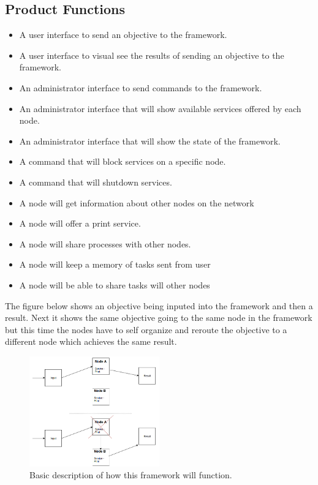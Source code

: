 \documentclass[draftclsnofoot, onecolumn, compsoc, 10pt]{IEEEtran}
\begin{document}
\subsection{Product Functions}
\begin{itemize}
\item A user interface to send an objective to the framework.
\item A user interface to visual see the results of sending an objective to the framework.
\item An administrator interface to send commands to the framework.
\item An administrator interface that will show available services offered by each node. \item An administrator interface that will show the state of the framework.
\item A command that will block services on a specific node.
\item A command that will shutdown services.
\item A node will get information about other nodes on the network
\item A node will offer a print service.
\item A node will share processes with other nodes.
\item A node will keep a memory of tasks sent from user
\item A node will be able to share tasks will other nodes
\end{itemize}
The figure below shows an objective being inputed into the framework and then a result. Next it shows the same objective going to the same node in the framework but this time the nodes have to self organize and reroute the objective to a different node which achieves the same result.
\begin{figure}[!htb]
  \caption{Basic description of how this framework will function. }
  \centering
    \includegraphics[width=0.5\textwidth]{img_1}
\end{figure}
\FloatBarrier
\end{document}
